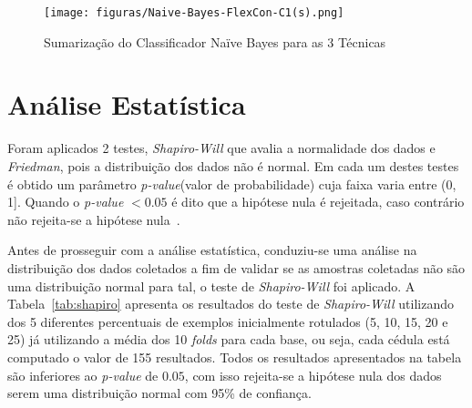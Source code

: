     \begin{figure}[h]
        \centering
        \caption{Sumarização do Classificador Naïve Bayes para as 3 Técnicas}
        \texttt{[image: figuras/Naive-Bayes-FlexCon-C1(s).png]}
        \label{fig:my_label}
    \end{figure}
    
    \section{Análise Estatística}
        \label{sec:statistical-analysis}
        Foram aplicados 2 testes, \textit{Shapiro-Will} que avalia a normalidade dos dados e \textit{Friedman}, pois a distribuição dos dados não é normal. Em cada um destes testes é obtido um parâmetro \textit{p\hyp{value}}(valor de probabilidade) cuja faixa varia entre (0, 1]. Quando o \textit{p\hyp{value}} $< 0.05$ é dito que a hipótese nula é rejeitada, caso contrário não rejeita\hyp{se} a hipótese nula~\cite{hoffman2015statistics}.

        Antes de prosseguir com a análise estatística, conduziu\hyp{se} uma análise na distribuição dos dados coletados a fim de validar se as amostras coletadas não são uma distribuição normal para tal, o teste de \textit{Shapiro-Will} foi aplicado. A Tabela~\ref{tab:shapiro} apresenta os resultados do teste de \textit{Shapiro-Will} utilizando dos 5 diferentes percentuais de exemplos inicialmente rotulados (5, 10, 15, 20 e 25) já utilizando a média dos 10 \textit{folds} para cada base, ou seja, cada cédula está computado o valor de 155 resultados. Todos os resultados apresentados na tabela são inferiores ao \textit{p\hyp{value}} de $0.05$, com isso rejeita\hyp{se} a hipótese nula dos dados serem uma distribuição normal com 95\% de confiança.

